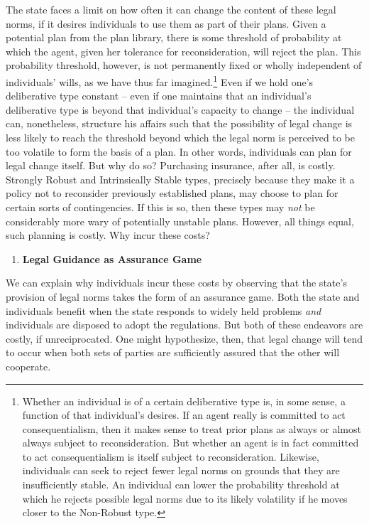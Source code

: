 The state faces a limit on how often it can change the content of these
legal norms, if it desires individuals to use them as part of their
plans. Given a potential plan from the plan library, there is some
threshold of probability at which the agent, given her tolerance for
reconsideration, will reject the plan. This probability threshold,
however, is not permanently fixed or wholly independent of individuals'
wills, as we have thus far imagined.\footnote{Whether an individual is
  of a certain deliberative type is, in some sense, a function of that
  individual's desires. If an agent really is committed to act
  consequentialism, then it makes sense to treat prior plans as always
  or almost always subject to reconsideration. But whether an agent is
  in fact committed to act consequentialism is itself subject to
  reconsideration. Likewise, individuals can seek to reject fewer legal
  norms on grounds that they are insufficiently stable. An individual
  can lower the probability threshold at which he rejects possible legal
  norms due to its likely volatility if he moves closer to the
  Non-Robust type.} Even if we hold one's deliberative type constant --
even if one maintains that an individual's deliberative type is beyond
that individual's capacity to change -- the individual can, nonetheless,
structure his affairs such that the possibility of legal change is less
likely to reach the threshold beyond which the legal norm is perceived
to be too volatile to form the basis of a plan. In other words,
individuals can plan for legal change itself. But why do so? Purchasing
insurance, after all, is costly. Strongly Robust and Intrinsically
Stable types, precisely because they make it a policy not to reconsider
previously established plans, may choose to plan for certain sorts of
contingencies. If this is so, then these types may \emph{not} be
considerably more wary of potentially unstable plans. However, all
things equal, such planning is costly. Why incur these costs?

\begin{enumerate}
\def\labelenumi{\arabic{enumi}.}
\item
  \textbf{Legal Guidance as Assurance Game}
\end{enumerate}

We can explain why individuals incur these costs by observing that the
state's provision of legal norms takes the form of an assurance game.
Both the state and individuals benefit when the state responds to widely
held problems \emph{and} individuals are disposed to adopt the
regulations. But both of these endeavors are costly, if unreciprocated.
One might hypothesize, then, that legal change will tend to occur when
both sets of parties are sufficiently assured that the other will
cooperate.

